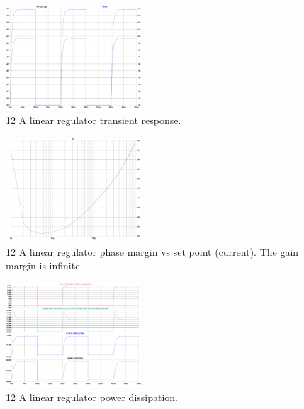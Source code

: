 \FloatBarrier
\begin{figure}[ht!]
    \section{}\label{sec:hardware_images}
    \centering
    \includegraphics[width=0.45\textwidth]{LT3080-1_Transient-response.pdf}
    \caption{12 A linear regulator transient response.}
    \label{fig:LT3080-1_Transient-response}
\end{figure}

\begin{figure}[ht!]
    \centering
    \includegraphics[width=0.45\textwidth]{LT3080-1_Phase-margin_VS_setpoint.pdf}
    \caption{12 A linear regulator phase margin vs set point (current). The gain margin is infinite}
    \label{fig:LT3080-1_Phase-margin_VS_setpoint}
\end{figure}

\begin{figure}[ht!]
    \centering
    \includegraphics[width=0.45\textwidth]{LT3080-1_PowerDissipation.pdf}
    \caption{12 A linear regulator power dissipation.}
    \label{fig:LT3080-1_PowerDissipation}
\end{figure}

